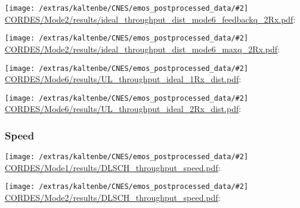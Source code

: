 \documentclass[a4paper,10pt]{article}
\newcommand{\printfile}[2][]{
 \begin{minipage}{8cm}
  \centering
  \texttt{[image: /extras/kaltenbe/CNES/emos\_postprocessed\_data/\#2]}
  \url{#2}: #1

 \end{minipage}
}
\begin{document}
\printfile{CORDES/Mode2/results/ideal_throughput_dist_mode6_feedbackq_2Rx.pdf}
%
\printfile{CORDES/Mode2/results/ideal_throughput_dist_mode6_maxq_2Rx.pdf}

\printfile{CORDES/Mode6/results/UL_throughput_ideal_1Rx_dist.pdf}
\printfile{CORDES/Mode6/results/UL_throughput_ideal_2Rx_dist.pdf}


\subsubsection{Speed}

\printfile{CORDES/Mode1/results/DLSCH_throughput_speed.pdf}
\printfile{CORDES/Mode2/results/DLSCH_throughput_speed.pdf}
\end{document}
